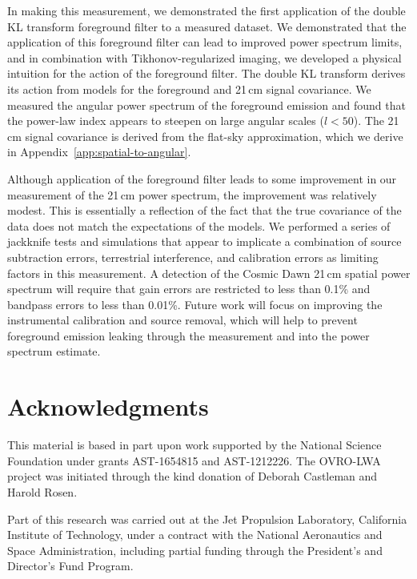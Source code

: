 \begin{bibunit}
In making this measurement, we demonstrated the first application of the double KL transform
foreground filter to a measured dataset. We demonstrated that the application of this foreground
filter can lead to improved power spectrum limits, and in combination with Tikhonov-regularized
imaging, we developed a physical intuition for the action of the foreground filter.  The double KL
transform derives its action from models for the foreground and 21\,cm signal covariance. We
measured the angular power spectrum of the foreground emission and found that the power-law index
appears to steepen on large angular scales ($l < 50$). The 21\,cm signal covariance is derived from
the flat-sky approximation, which we derive in Appendix~\ref{app:spatial-to-angular}.

Although application of the foreground filter leads to some improvement in our measurement of the
21\,cm power spectrum, the improvement was relatively modest. This is essentially a reflection of
the fact that the true covariance of the data does not match the expectations of the models. We
performed a series of jackknife tests and simulations that appear to implicate a combination of
source subtraction errors, terrestrial interference, and calibration errors as limiting factors in
this measurement. A detection of the Cosmic Dawn 21\,cm spatial power spectrum will require that
gain errors are restricted to less than 0.1\% and bandpass errors to less than 0.01\%.  Future work
will focus on improving the instrumental calibration and source removal, which will help to prevent
foreground emission leaking through the measurement and into the power spectrum estimate.

\section*{Acknowledgments}

This material is based in part upon work supported by the National Science Foundation under grants
AST-1654815 and AST-1212226. The OVRO-LWA project was initiated through the kind donation of Deborah
Castleman and Harold Rosen.

Part of this research was carried out at the Jet Propulsion Laboratory, California Institute of
Technology, under a contract with the National Aeronautics and Space Administration, including
partial funding through the President's and Director's Fund Program.


\end{bibunit}
